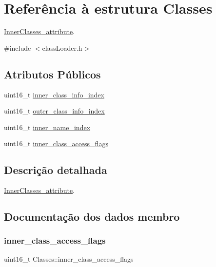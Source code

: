 \hypertarget{struct_classes}{}\section{Referência à estrutura Classes}
\label{struct_classes}


\hyperlink{struct_inner_classes__attribute}{Inner\+Classes\+\_\+attribute}.  




{\ttfamily \#include $<$class\+Loader.\+h$>$}

\subsection*{Atributos Públicos}
\begin{DoxyCompactItemize}
\item 
uint16\+\_\+t \hyperlink{struct_classes_a98fa3268c87694828cf50cfd2b599262}{inner\+\_\+class\+\_\+info\+\_\+index}
\item 
uint16\+\_\+t \hyperlink{struct_classes_a8a7bf0f9ba61c6f429411254c9825c7a}{outer\+\_\+class\+\_\+info\+\_\+index}
\item 
uint16\+\_\+t \hyperlink{struct_classes_adf9e2bd7f6af4bb97362aa98d6ddd4ad}{inner\+\_\+name\+\_\+index}
\item 
uint16\+\_\+t \hyperlink{struct_classes_a9013fe3c530fddf92a45038d646bb305}{inner\+\_\+class\+\_\+access\+\_\+flags}
\end{DoxyCompactItemize}


\subsection{Descrição detalhada}
\hyperlink{struct_inner_classes__attribute}{Inner\+Classes\+\_\+attribute}. 

\subsection{Documentação dos dados membro}
\hypertarget{struct_classes_a9013fe3c530fddf92a45038d646bb305}{}\label{struct_classes_a9013fe3c530fddf92a45038d646bb305} 
\subsubsection{\texorpdfstring{inner\+\_\+class\+\_\+access\+\_\+flags}{inner\_class\_access\_flags}}
{\footnotesize\ttfamily uint16\+\_\+t Classes\+::inner\+\_\+class\+\_\+access\+\_\+flags}

